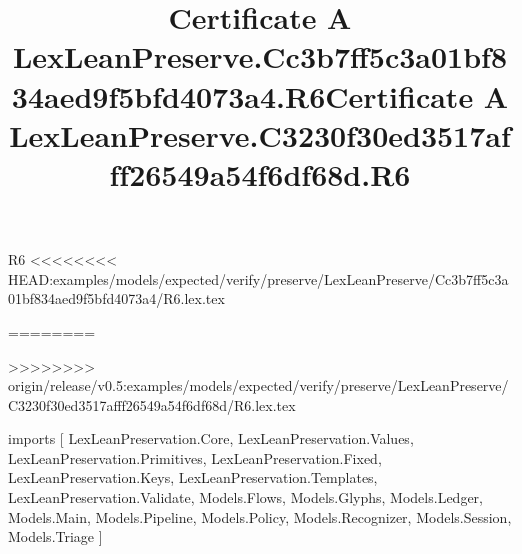 \begin{lexlean}{R6}
<<<<<<<< HEAD:examples/models/expected/verify/preserve/LexLeanPreserve/Cc3b7ff5c3a01bf834aed9f5bfd4073a4/R6.lex.tex
\title{Certificate A LexLeanPreserve.Cc3b7ff5c3a01bf834aed9f5bfd4073a4.R6}
========
\title{Certificate A LexLeanPreserve.C3230f30ed3517afff26549a54f6df68d.R6}
>>>>>>>> origin/release/v0.5:examples/models/expected/verify/preserve/LexLeanPreserve/C3230f30ed3517afff26549a54f6df68d/R6.lex.tex
\begin{coremodule}
imports [
  LexLeanPreservation.Core,
  LexLeanPreservation.Values,
  LexLeanPreservation.Primitives,
  LexLeanPreservation.Fixed,
  LexLeanPreservation.Keys,
  LexLeanPreservation.Templates,
  LexLeanPreservation.Validate,
  Models.Flows,
  Models.Glyphs,
  Models.Ledger,
  Models.Main,
  Models.Pipeline,
  Models.Policy,
  Models.Recognizer,
  Models.Session,
  Models.Triage
]


\end{coremodule}
\end{lexlean}
